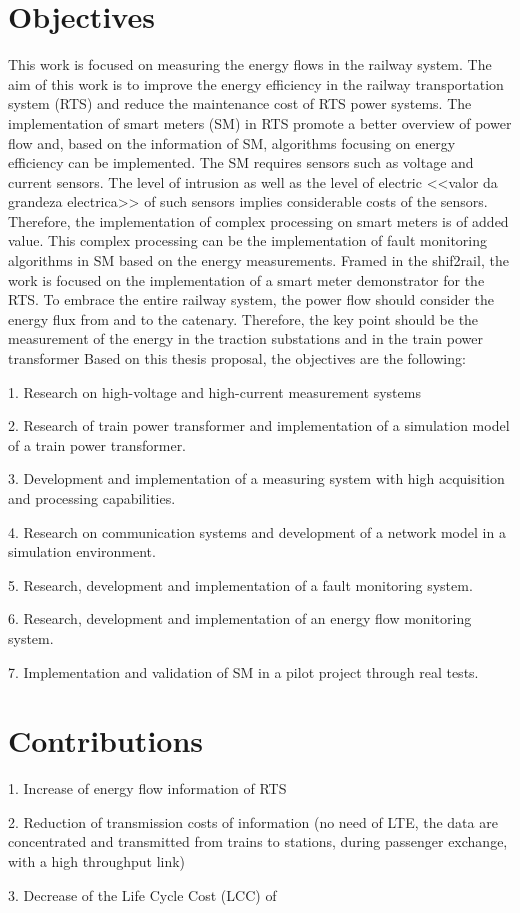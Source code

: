 

\lipsum[4-4]


\section{Objectives}

This work is focused on measuring the energy flows in the railway system.
The aim of this work is to improve the energy efficiency in the railway transportation system (RTS) and reduce the maintenance cost of RTS power systems.
The implementation of smart meters (SM) in RTS promote a better overview of power flow and, based on the information of SM, algorithms focusing on energy efficiency can be implemented.
The SM requires sensors such as voltage and current sensors. The level of intrusion as well as the level of electric <<valor da grandeza electrica>> of such sensors implies considerable costs of the sensors.
Therefore, the implementation of complex processing on smart meters is of added value. This complex processing can be the implementation of fault monitoring algorithms in SM based on the energy measurements.
Framed in the shif2rail, the work is focused on the implementation of a smart meter demonstrator for the RTS. To embrace the entire railway system, the power flow should consider the energy flux from and to the catenary. Therefore, the key point should be the measurement of the energy in the traction substations and in the train power transformer 
Based on this thesis proposal, the objectives are the following:

1.	Research on high-voltage and high-current measurement systems

2.	Research of train power transformer and implementation of a simulation model of a train power transformer.

3.	Development and implementation of a measuring system with high acquisition and processing capabilities.

4.	Research on communication systems and development of a network model in a simulation environment.

5.	Research, development and implementation of a fault monitoring system.

6.	Research, development and implementation of an energy flow monitoring system.

7.	Implementation and validation of SM in a pilot project through real tests.


\section{Contributions}

1.	Increase of energy flow information of RTS

2.	Reduction of transmission costs of information (no need of LTE, the data are concentrated and transmitted from trains to stations, during passenger exchange, with a high throughput link)

3.	Decrease of the Life Cycle Cost (LCC) of 





